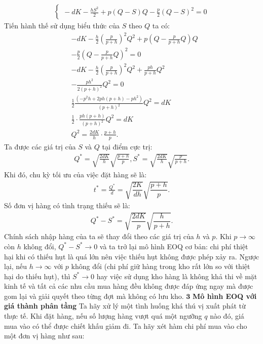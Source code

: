 \begin{multicols}{2}
\begin{align*}
\begin{cases}
			\!-\!dK \!-\! \frac{hS^2}{2} \!+\! p(Q-S)Q \!-\! \frac{p}{2}(Q\!-\!S)^2 \!=\! 0
		\end{cases}
	\end{align*}
	Tiến hành thế sử dụng biểu thức của $S$ theo $Q$ ta có:
	\begin{align*}
		&-dK \!-\! \frac{h}{2}\left(\!\!\frac{p}{p+h}\!\!\right)^2Q^2 \!+\! p\left(\!\!Q \!-\! \frac{p}{p+h}Q\!\right)\!Q \\
		&- \frac{p}{2}\left(Q - \frac{p}{p+h}Q\right)^2 = 0\\
		&-dK - \frac{h}{2}\left(\frac{p}{p+h}\right)^2Q^2 + \frac{ph}{p+h}Q^2 \\
		&- \frac{ph^2}{2(p+h)^2}Q^2 = 0\\
		&\frac{1}{2}\frac{\left(-p^2h + 2ph(p+h)-ph^2\right)}{(p+h)^2}Q^2 = dK\\
		&\frac{1}{2}\cdot\frac{ph(p+h)}{(p+h)^2}Q^2 = dK\\
		&Q^2 = \frac{2dK}{h}\cdot\frac{p+h}{p}.
	\end{align*}
	Ta được các giá trị của $S$ và $Q$ tại điểm cực trị:
	\begin{align*}
		Q^*\!=\!\sqrt{\frac{2dK}{h}}\sqrt{\!\frac{p+h}{p}},S^*\!=\! \sqrt{\!\frac{2dK}{h}}\sqrt{\!\frac{p}{p+h}}.
	\end{align*}
	Khi đó, chu kỳ tối ưu của việc đặt hàng sẽ là:
	\begin{align*}
		t^* = \frac{Q^*}{d}= \sqrt{\dfrac{2K}{dh}}\sqrt{\dfrac{p+h}{p}}.
	\end{align*}
	Số đơn vị hàng có tình trạng thiếu sẽ là:
	\begin{align*}
		Q^*- S^* = \sqrt{\dfrac{2dK}{p}}\sqrt{\dfrac{h}{p+h}}.
	\end{align*}
	Chính sách nhập hàng của ta sẽ thay đổi theo các giá trị của $h$ và $p$. Khi $p \to \infty$ còn $h$ không đổi, $Q^*-S^* \to 0$ và ta trở lại mô hình EOQ cơ bản: chi phí thiệt hại khi có thiếu hụt là quá lớn nên việc thiếu hụt không được phép xảy ra. Ngược lại, nếu $h \to \infty$ với $p$ không đổi (chi phí giữ hàng trong kho rất lớn so với thiệt hại do thiếu hụt), thì $S^* \to 0$ hay việc sử dụng kho hàng là không khả thi về mặt kinh tế và tất cả các nhu cầu mua hàng đều không được đáp ứng ngay mà được gom lại và giải quyết theo từng đợt mà không có lưu kho.
	\vskip 0.1cm
	$\pmb{3}$ \textbf{\color{toanhocdoisong}Mô hình EOQ với giá thành phân tầng}
	\vskip 0.1cm
	Ta hãy xử lý một tình huống khá thú vị xuất phát từ thực tế. Khi đặt hàng, nếu số lượng hàng vượt quá một ngưỡng $q$ nào đó, giá mua vào có thể được chiết khấu giảm đi. Ta hãy xét hàm chi phí mua vào cho một đơn vị hàng như sau:

\end{multicols}
